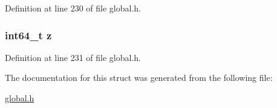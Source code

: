 Definition at line 230 of file global.\-h.

\hypertarget{structint64Vector3d_a44624880ae3bb63041297b70cb33408b}{
\subsubsection[{z}]{\setlength{\rightskip}{0pt plus 5cm}int64\-\_\-t z}}\label{structint64Vector3d_a44624880ae3bb63041297b70cb33408b}


Definition at line 231 of file global.\-h.



The documentation for this struct was generated from the following file\-:\begin{DoxyCompactItemize}
\item 
\hyperlink{global_8h}{global.\-h}\end{DoxyCompactItemize}
